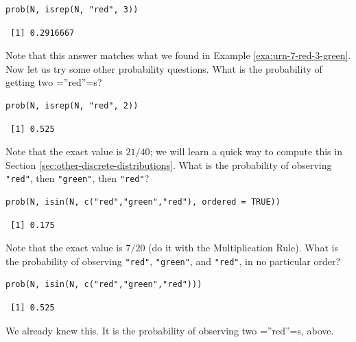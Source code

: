 \documentclass[captions=tableheading]{scrbook}
\begin{document}
\begin{verbatim}
prob(N, isrep(N, "red", 3))
\end{verbatim}

\begin{verbatim}
 [1] 0.2916667
\end{verbatim}

Note that this answer matches what we found in Example \ref{exa:urn-7-red-3-green}. Now let us try some other probability questions. What is the probability of getting two =''red''=s?


\begin{verbatim}
prob(N, isrep(N, "red", 2))
\end{verbatim}

\begin{verbatim}
 [1] 0.525
\end{verbatim}


Note that the exact value is \(21/40\); we will learn a quick way to compute this in Section \ref{sec:other-discrete-distributions}. What is the probability of observing \texttt{"red"}, then \texttt{"green"}, then \texttt{"red"}?


\begin{verbatim}
prob(N, isin(N, c("red","green","red"), ordered = TRUE))
\end{verbatim}

\begin{verbatim}
 [1] 0.175
\end{verbatim}

Note that the exact value is \(7/20\) (do it with the Multiplication Rule). What is the probability of observing \texttt{"red"}, \texttt{"green"}, and \texttt{"red"}, in no particular order?


\begin{verbatim}
prob(N, isin(N, c("red","green","red")))
\end{verbatim}

\begin{verbatim}
 [1] 0.525
\end{verbatim}

We already knew this. It is the probability of observing two =''red''=s, above.
\end{document}
